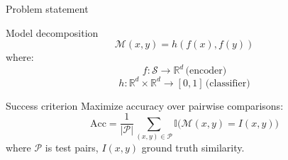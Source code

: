 \documentclass{beamer}
\begin{document}
\begin{frame}{Problem statement}
\begin{block}{Model decomposition}
    $$ \mathcal{M}(x, y) = h(f(x), f(y)) $$
    where:
    $$ f : \mathcal{S} \rightarrow \mathbb{R}^d \, \text{(encoder)} $$
    $$ h : \mathbb{R}^d \times \mathbb{R}^d \rightarrow [0, 1] \, \text{(classifier)} $$
\end{block}

\begin{block}{Success criterion}
    Maximize accuracy over pairwise comparisons:
    \begin{equation*}
    \text{Acc} = \frac{1}{|\mathcal{P}|} \sum_{(x,y) \in \mathcal{P}} \mathbb{I}\big(\mathcal{M}(x,y) = I(x,y)\big)
    \end{equation*}
    where $\mathcal{P}$ is test pairs, $I(x,y)$ ground truth similarity.
\end{block}
\end{frame}

\end{document}
